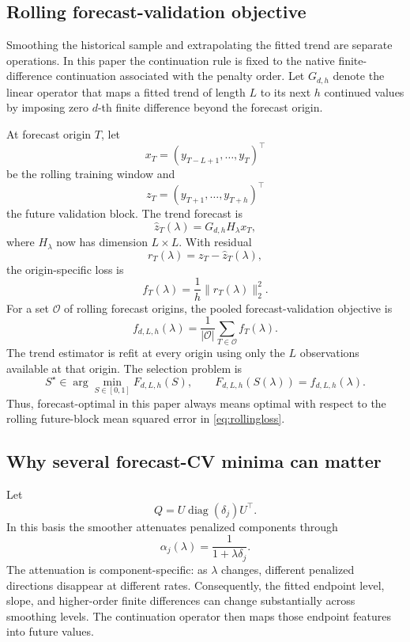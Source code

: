 \documentclass[english]{smcca}
\begin{document}
\subsection{Rolling forecast-validation objective}

Smoothing the historical sample and extrapolating the fitted trend are separate operations. In this paper the continuation rule is fixed to the native finite-difference continuation associated with the penalty order. Let \(G_{d,h}\) denote the linear operator that maps a fitted trend of length \(L\) to its next \(h\) continued values by imposing zero \(d\)-th finite difference beyond the forecast origin.

At forecast origin \(T\), let
\[
x_T=(y_{T-L+1},\ldots,y_T)^\top
\]
be the rolling training window and
\[
z_T=(y_{T+1},\ldots,y_{T+h})^\top
\]
the future validation block. The trend forecast is
\[
\widehat z_T(\lambda)
=
G_{d,h}H_\lambda x_T,
\]
where \(H_\lambda\) now has dimension \(L\times L\). With residual
\[
r_T(\lambda)=z_T-\widehat z_T(\lambda),
\]
the origin-specific loss is
\[
f_T(\lambda)
=
\frac{1}{h}\|r_T(\lambda)\|_2^2.
\]
For a set \(\mathcal{O}\) of rolling forecast origins, the pooled forecast-validation objective is
\begin{equation}
f_{d,L,h}(\lambda)
=
\frac{1}{|\mathcal{O}|}
\sum_{T\in\mathcal{O}}f_T(\lambda).
\label{eq:rollingloss}
\end{equation}
The trend estimator is refit at every origin using only the \(L\) observations available at that origin. The selection problem is
\begin{equation}
S^\star
\in
\arg\min_{S\in[0,1]}
F_{d,L,h}(S),
\qquad
F_{d,L,h}(S(\lambda))
=
f_{d,L,h}(\lambda).
\label{eq:selection}
\end{equation}
Thus, forecast-optimal in this paper always means optimal with respect to the rolling future-block mean squared error in \eqref{eq:rollingloss}.

\subsection{Why several forecast-CV minima can matter}

Let
\[
Q=U\operatorname{diag}(\delta_j)U^\top.
\]
In this basis the smoother attenuates penalized components through
\begin{equation}
\alpha_j(\lambda)
=
\frac{1}{1+\lambda\delta_j}.
\label{eq:spectralattenuation}
\end{equation}
The attenuation is component-specific: as \(\lambda\) changes, different
penalized directions disappear at different rates. Consequently, the fitted
endpoint level, slope, and higher-order finite differences can change
substantially across smoothing levels. The continuation operator then maps
those endpoint features into future values.
\end{document}
